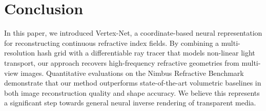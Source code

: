\section{Conclusion}
In this paper, we introduced Vertex-Net, a coordinate-based neural representation for reconstructing continuous refractive index fields. By combining a multi-resolution hash grid with a differentiable ray tracer that models non-linear light transport, our approach recovers high-frequency refractive geometries from multi-view images. Quantitative evaluations on the Nimbus Refractive Benchmark demonstrate that our method outperforms state-of-the-art volumetric baselines in both image reconstruction quality and shape accuracy. We believe this represents a significant step towards general neural inverse rendering of transparent media.
